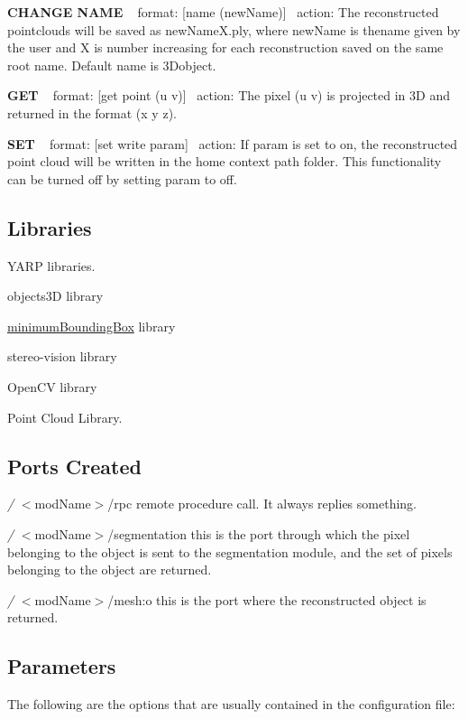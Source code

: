 {\bfseries C\+H\+A\+N\+GE N\+A\+ME} ~\newline
format\+: \mbox{[}name (new\+Name)\mbox{]}~\newline
action\+: The reconstructed pointclouds will be saved as new\+Name\+X.\+ply, where new\+Name is thename given by the user and X is number increasing for each reconstruction saved on the same root name. Default name is 3\+Dobject.

{\bfseries G\+ET} ~\newline
format\+: \mbox{[}get point (u v)\mbox{]}~\newline
action\+: The pixel (u v) is projected in 3D and returned in the format (x y z).

{\bfseries S\+ET} ~\newline
format\+: \mbox{[}set write param\mbox{]}~\newline
action\+: If param is set to on, the reconstructed point cloud will be written in the home context path folder. This functionality can be turned off by setting param to off.\hypertarget{group__handIKModule_lib_sec}{}\subsection{Libraries}\label{group__handIKModule_lib_sec}

\begin{DoxyItemize}
\item Y\+A\+RP libraries.
\item objects3D library
\item \hyperlink{group__minimumBoundingBox}{minimum\+Bounding\+Box} library
\item stereo-\/vision library
\item Open\+CV library
\item Point Cloud Library.
\end{DoxyItemize}\hypertarget{group__handIKModule_portsc_sec}{}\subsection{Ports Created}\label{group__handIKModule_portsc_sec}

\begin{DoxyItemize}
\item {\itshape /} $<$mod\+Name$>$/rpc remote procedure call. It always replies something.
\item {\itshape /} $<$mod\+Name$>$/segmentation this is the port through which the pixel belonging to the object is sent to the segmentation module, and the set of pixels belonging to the object are returned.
\item {\itshape /} $<$mod\+Name$>$/mesh\+:o this is the port where the reconstructed object is returned.
\end{DoxyItemize}\hypertarget{group__handIKModule_parameters_sec}{}\subsection{Parameters}\label{group__handIKModule_parameters_sec}
The following are the options that are usually contained in the configuration file\+:

